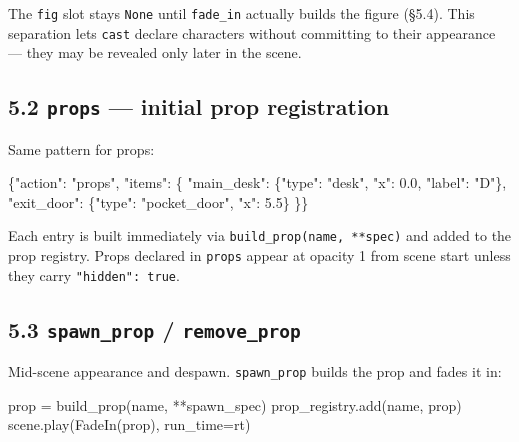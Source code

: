 \documentclass[
  12pt,
  letterpaper,
]{book}
\newenvironment{Shaded}{}{}
\newcommand{\FloatTok}[1]{\textcolor[rgb]{0.25,0.63,0.44}{#1}}
\newcommand{\NormalTok}[1]{#1}
\newcommand{\OperatorTok}[1]{\textcolor[rgb]{0.40,0.40,0.40}{#1}}
\newcommand{\StringTok}[1]{\textcolor[rgb]{0.25,0.44,0.63}{#1}}
\begin{document}
The \texttt{fig} slot stays \texttt{None} until \texttt{fade\_in}
actually builds the figure (§5.4). This separation lets \texttt{cast}
declare characters without committing to their appearance --- they may
be revealed only later in the scene.

\subsection{\texorpdfstring{5.2 \texttt{props} --- initial prop
registration}{5.2 props --- initial prop registration}}\label{props-initial-prop-registration}

Same pattern for props:

\begin{Shaded}
\begin{Highlighting}[]
\NormalTok{\{}\StringTok{"action"}\NormalTok{: }\StringTok{"props"}\NormalTok{, }\StringTok{"items"}\NormalTok{: \{}
  \StringTok{"main\_desk"}\NormalTok{: \{}\StringTok{"type"}\NormalTok{: }\StringTok{"desk"}\NormalTok{, }\StringTok{"x"}\NormalTok{: }\FloatTok{0.0}\NormalTok{, }\StringTok{"label"}\NormalTok{: }\StringTok{"D"}\NormalTok{\},}
  \StringTok{"exit\_door"}\NormalTok{: \{}\StringTok{"type"}\NormalTok{: }\StringTok{"pocket\_door"}\NormalTok{, }\StringTok{"x"}\NormalTok{: }\FloatTok{5.5}\NormalTok{\}}
\NormalTok{\}\}}
\end{Highlighting}
\end{Shaded}

Each entry is built immediately via \texttt{build\_prop(name,\ **spec)}
and added to the prop registry. Props declared in \texttt{props} appear
at opacity 1 from scene start unless they carry
\texttt{"hidden":\ true}.

\subsection{\texorpdfstring{5.3 \texttt{spawn\_prop} /
\texttt{remove\_prop}}{5.3 spawn\_prop / remove\_prop}}\label{spawn_prop-remove_prop}

Mid-scene appearance and despawn. \texttt{spawn\_prop} builds the prop
and fades it in:

\begin{Shaded}
\begin{Highlighting}[]
\NormalTok{prop }\OperatorTok{=}\NormalTok{ build\_prop(name, }\OperatorTok{**}\NormalTok{spawn\_spec)}
\NormalTok{prop\_registry.add(name, prop)}
\NormalTok{scene.play(FadeIn(prop), run\_time}\OperatorTok{=}\NormalTok{rt)}
\end{Highlighting}
\end{Shaded}
\end{document}
